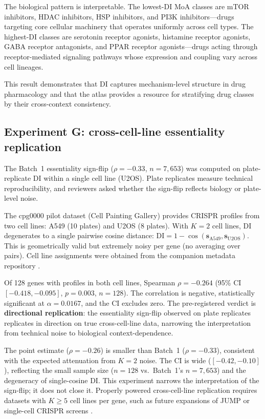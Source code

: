 \documentclass[11pt]{article}
\begin{document}
The biological pattern is interpretable.  The lowest-DI MoA classes are
mTOR inhibitors, HDAC inhibitors, HSP inhibitors, and PI3K
inhibitors---drugs targeting core cellular machinery that operates
uniformly across cell types.  The highest-DI classes are serotonin
receptor agonists, histamine receptor agonists, GABA receptor
antagonists, and PPAR receptor agonists---drugs acting through
receptor-mediated signaling pathways whose expression and coupling vary
across cell lineages.

This result demonstrates that DI captures mechanism-level structure in
drug pharmacology and that the atlas provides a resource for stratifying
drug classes by their cross-context consistency.

\subsection{Experiment G: cross-cell-line essentiality replication}

The Batch~1 essentiality sign-flip ($\rho = -0.33$, $n = 7{,}653$) was
computed on plate-replicate DI within a single cell line (U2OS).  Plate
replicates measure technical reproducibility, and reviewers asked whether
the sign-flip reflects biology or plate-level noise.

The cpg0000 pilot dataset (Cell Painting Gallery) provides CRISPR
profiles from two cell lines: A549 (10 plates) and U2OS (8 plates).
With $K = 2$ cell lines, DI degenerates to a single pairwise cosine
distance: $\mathrm{DI} = 1 - \cos(\mathbf{s}_{\mathrm{A549}},
\mathbf{s}_{\mathrm{U2OS}})$.  This is geometrically valid but
extremely noisy per gene (no averaging over pairs).  Cell line
assignments were obtained from the companion metadata repository
\citep{chandrasekaran2024cpjump1}.

Of 128 genes with profiles in both cell lines, Spearman
$\rho = -0.264$ (95\% CI $[-0.418, -0.095]$, $p = 0.003$,
$n = 128$).  The correlation is negative, statistically significant
at $\alpha = 0.0167$, and the CI excludes zero.  The pre-registered
verdict is \textbf{directional replication}: the essentiality sign-flip
observed on plate replicates replicates in direction on true
cross-cell-line data, narrowing the interpretation from technical noise
to biological context-dependence.

The point estimate ($\rho = -0.26$) is smaller than Batch~1
($\rho = -0.33$), consistent with the expected attenuation from $K = 2$
noise.  The CI is wide ($[-0.42, -0.10]$), reflecting the small
sample size ($n = 128$ vs.\ Batch~1's $n = 7{,}653$) and the
degeneracy of single-cosine DI.  This experiment narrows the
interpretation of the sign-flip; it does not close it.  Properly powered
cross-cell-line replication requires datasets with $K \geq 5$ cell
lines per gene, such as future expansions of JUMP or single-cell CRISPR
screens \citep{tahoe2025}.
\end{document}
